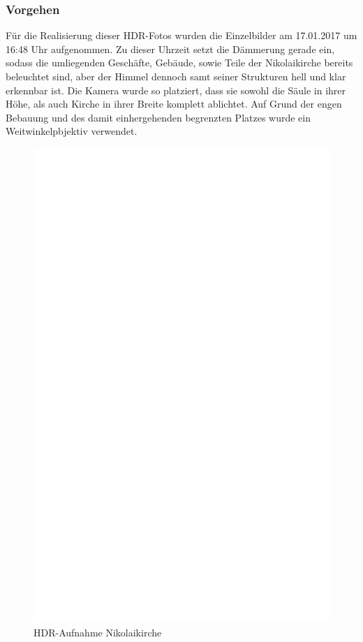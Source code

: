 \documentclass[liststotoc,bibtotoc,fontsize=14pt,]{scrreprt}
\begin{document}
\subsubsection{Vorgehen}
Für die Realisierung dieser HDR-Fotos wurden die Einzelbilder am 17.01.2017 um 16:48 Uhr aufgenommen. Zu dieser Uhrzeit setzt die Dämmerung gerade ein, sodass die umliegenden Geschäfte, Gebäude, sowie Teile der Nikolaikirche bereits beleuchtet sind, aber der Himmel dennoch samt seiner Strukturen hell und klar erkennbar ist.  Die Kamera wurde so platziert, dass sie sowohl die Säule in ihrer Höhe, als auch Kirche in ihrer Breite komplett ablichtet. Auf Grund der engen Bebauung und des damit einhergehenden begrenzten Platzes wurde ein Weitwinkelpbjektiv verwendet. 
\newpage
\begin{figure}[h]
	\includegraphics[width=\linewidth]{img/ph.jpg}
	\caption{HDR-Aufnahme Nikolaikirche}
\end{figure}
	
\end{document}
